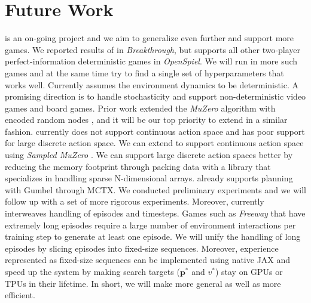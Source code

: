 \chapter{Future Work}
\moozi is an on-going project and we aim to generalize \moozi even further and support more games.
We reported results of \moozi in \textit{Breakthrough}, but \moozi supports all other two-player perfect-information deterministic games in \textit{OpenSpiel}.
We will run \moozi in more such games and at the same time try to find a single set of hyperparameters that works well.
Currently \moozi assumes the environment dynamics to be deterministic.
A promising direction is to handle stochasticity and support non-deterministic video games and board games.
Prior work extended the \textit{MuZero} algorithm with encoded random nodes \cite{VectorQuantizedModels_Ozair.Li.ea_2021,PlanningStochasticEnvironments_Antonoglou.Schrittwieser.ea_2022}, and it will be our top priority to extend \moozi in a similar fashion.
\moozi currently does not support continuous action space and has poor support for large discrete action space.
We can extend \moozi to support continuous action space using \textit{Sampled MuZero} \cite{LearningPlanningComplex_Hubert.Schrittwieser.ea_2021}.
We can support large discrete action spaces better by reducing the memory footprint through packing data with a library that specializes in handling sparse N-dimensional arrays.
\moozi already supports planning with Gumbel \cite{PolicyImprovementPlanning_Danihelka.Guez.ea_2022} through MCTX.
We conducted preliminary experiments and we will follow up with a set of more rigorous experiments.
Moreover, \moozi currently interweaves handling of episodes and timesteps.
Games such as \textit{Freeway} that have extremely long episodes require a large number of environment interactions per training step to generate at least one episode.
We will unify the handling of long episodes by slicing episodes into fixed-size sequences.
Moreover, experience represented as fixed-size sequences can be implemented using native JAX and speed up the system by making search targets (\(\mathbf{p}^{*}\) and $v^{*}$) stay on GPUs or TPUs in their lifetime.
In short, we will make \moozi more general as well as more efficient.